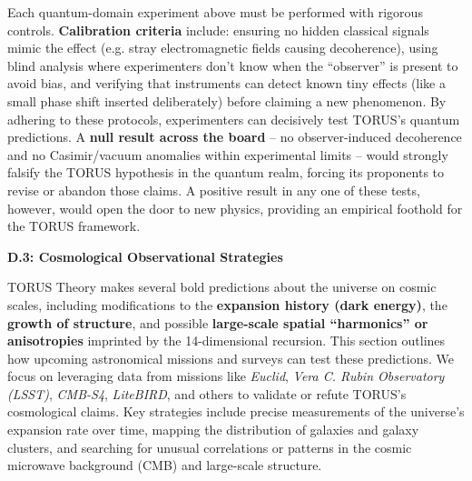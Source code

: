 Each quantum-domain experiment above must be performed with rigorous
controls. \textbf{Calibration criteria} include: ensuring no hidden
classical signals mimic the effect (e.g. stray electromagnetic fields
causing decoherence), using blind analysis where experimenters don't
know when the ``observer'' is present to avoid bias, and verifying that
instruments can detect known tiny effects (like a small phase shift
inserted deliberately) before claiming a new phenomenon. By adhering to
these protocols, experimenters can decisively test TORUS's quantum
predictions. A \textbf{null result across the board} -- no
observer-induced decoherence and no Casimir/vacuum anomalies within
experimental limits -- would strongly falsify the TORUS hypothesis in
the quantum realm, forcing its proponents to revise or abandon those
claims. A positive result in any one of these tests, however, would open
the door to new physics, providing an empirical foothold for the TORUS
framework.

\textbf{D.3: Cosmological Observational Strategies}

TORUS Theory makes several bold predictions about the universe on cosmic
scales, including modifications to the \textbf{expansion history (dark
energy)}, the \textbf{growth of structure}, and possible
\textbf{large-scale spatial ``harmonics'' or anisotropies} imprinted by
the 14-dimensional recursion. This section outlines how upcoming
astronomical missions and surveys can test these predictions. We focus
on leveraging data from missions like \emph{Euclid}, \emph{Vera C. Rubin
Observatory (LSST)}, \emph{CMB-S4}, \emph{LiteBIRD}, and others to
validate or refute TORUS's cosmological claims. Key strategies include
precise measurements of the universe's expansion rate over time, mapping
the distribution of galaxies and galaxy clusters, and searching for
unusual correlations or patterns in the cosmic microwave background
(CMB) and large-scale structure.

